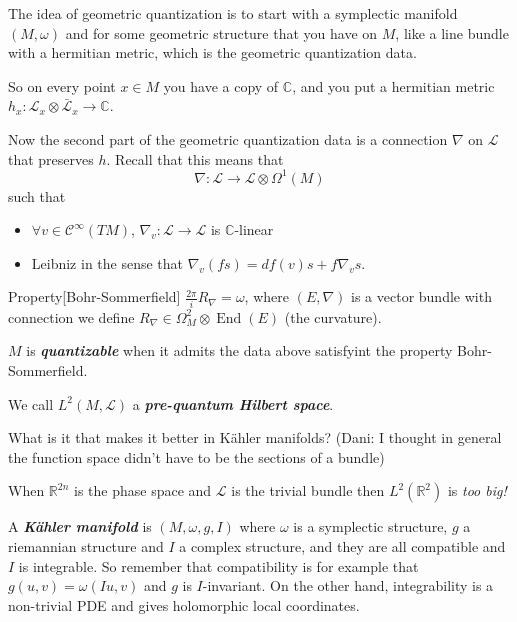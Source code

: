 The idea of geometric quantization is to start with a symplectic manifold $(M,\omega)$ and for some geometric structure that you have on $M$, like a line bundle with a hermitian metric, which is the geometric quantization data. 

So on every point $x \in M$ you have a copy of $\mathbb{C}$, and you put a hermitian metric $h_x:\mathcal{L}_x\otimes \bar{\mathcal{L}}_x\to \mathbb{C} $.

Now the second part of the geometric quantization data is a connection $\nabla$ on $\mathcal{L}$ that preserves $h$. Recall that this means that
\[\nabla :\mathcal{L}\to \mathcal{L}\otimes \Omega^{1}(M)\]
such that
\begin{itemize}
\item $\forall v\in\mathcal{C}^\infty(TM)$, $\nabla_v:\mathcal{L}\to  \mathcal{L}$ is $\mathbb{C}$-linear
\item Leibniz in the sense that $\nabla_v(fs)=df(v)s+f \nabla_vs$.
\end{itemize}

\begin{thing6}{Property}[Bohr-Sommerfield]\leavevmode
	$\frac{2\pi}{i}R_\nabla =\omega$, where $(E,\nabla )$ is a vector bundle with connection we define $R_\nabla \in\Omega^{2}_M \otimes \operatorname{End}(E)$ (the curvature).
\end{thing6}

\begin{defn}\leavevmode
	$M$ is \textit{\textbf{quantizable}} when it admits the data above satisfyint the property Bohr-Sommerfield. 

	We call $L^2(M,\mathcal{L})$ a \textit{\textbf{pre-quantum Hilbert space}}.
\end{defn}

\begin{question}\leavevmode
	What is it that makes it better in Kähler manifolds? (Dani: I thought in general the function space didn't have to be the sections of a bundle)
\end{question}

\begin{remark}[Sergey]\leavevmode
	When $\mathbb{R}^{2n}$ is the phase space and $\mathcal{L}$ is the trivial bundle then $L^2( \mathbb{R}^{2} )$ is \textit{too big!} 
\end{remark}

\begin{defn}\leavevmode
	A \textit{\textbf{Kähler manifold} } is $(M, \omega,g,I)$ where $\omega$ is a symplectic structure, $g$ a riemannian structure and  $I$ a complex structure, and they are all compatible and $I$ is integrable. So remember that compatibility is for example that $g(u,v)=\omega(Iu,v)$ and $g$ is  $I$-invariant. On the other hand, integrability is a non-trivial PDE and gives holomorphic local coordinates.
\end{defn}

